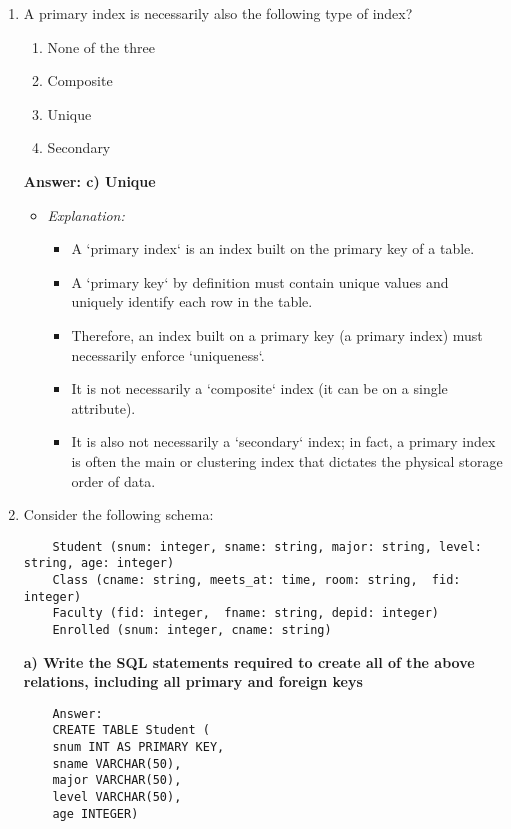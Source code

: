 \documentclass{article}
\begin{document}
\begin{enumerate}[label=\textbf{Question \arabic*.}]
\item A primary index is necessarily also the following type of index?
    \begin{enumerate}[label=\alph*)]
        \item None of the three
        \item Composite
        \item Unique
        \item Secondary
    \end{enumerate}
    \textbf{Answer: c) Unique}
    \begin{itemize}
        \item \textit{Explanation:}
        \begin{itemize}
            \item A `primary index` is an index built on the primary key of a table.
            \item A `primary key` by definition must contain unique values and uniquely identify each row in the table.
            \item Therefore, an index built on a primary key (a primary index) must necessarily enforce `uniqueness`.
            \item It is not necessarily a `composite` index (it can be on a single attribute).
            \item It is also not necessarily a `secondary` index; in fact, a primary index is often the main or clustering index that dictates the physical storage order of data.
        \end{itemize}
    \end{itemize}

\item Consider the following schema:\\
\begin{lstlisting}
    Student (snum: integer, sname: string, major: string, level: string, age: integer)
    Class (cname: string, meets_at: time, room: string,  fid: integer)
    Faculty (fid: integer,  fname: string, depid: integer)
    Enrolled (snum: integer, cname: string)
\end{lstlisting}

    \textbf{a) Write the SQL statements required to create all of the above relations, including all primary and foreign keys}
    \begin{lstlisting}
    Answer:
    CREATE TABLE Student (
    snum INT AS PRIMARY KEY,
    sname VARCHAR(50),
    major VARCHAR(50),
    level VARCHAR(50),
    age INTEGER)


\end{lstlisting}
\end{enumerate}
\end{document}
